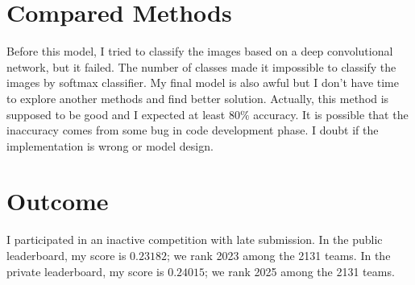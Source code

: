 \documentclass[11pt]{article}
\numberwithin{equation}{section}
\begin{document}
\section{Compared Methods}


Before this model, I tried to classify the images based on a deep convolutional network, but it failed. The number of classes made it impossible to classify the images by softmax classifier. My final model is also awful but I don't have time to explore another methods and find better solution. Actually, this method is supposed to be good and I expected at least $80\%$ accuracy. It is possible that the inaccuracy comes from some bug in code development phase. I doubt if the implementation is wrong or model design.

\section{Outcome}


I participated in an inactive competition with late submission.
In the public leaderboard, my score is $0.23182$; we rank 2023 among the 2131 teams. In the private leaderboard, my score is $0.24015$; we rank 2025 among the 2131 teams.








%





\end{document}
